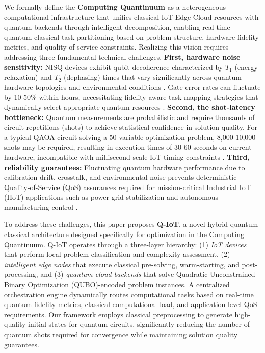 \documentclass[lettersize,journal]{IEEEtran}
\begin{document}
We formally define the \textbf{Computing Quantinuum} as a heterogeneous computational infrastructure that unifies classical IoT-Edge-Cloud resources with quantum backends through intelligent decomposition, enabling real-time quantum-classical task partitioning based on problem structure, hardware fidelity metrics, and quality-of-service constraints. Realizing this vision requires addressing three fundamental technical challenges. \textbf{First, hardware noise sensitivity:} NISQ devices exhibit qubit decoherence characterized by $T_1$ (energy relaxation) and $T_2$ (dephasing) times that vary significantly across quantum hardware topologies and environmental conditions \cite{Krantz2019}. Gate error rates can fluctuate by 10-50\% within hours, necessitating fidelity-aware task mapping strategies that dynamically select appropriate quantum resources \cite{Tannu2019}. \textbf{Second, the shot-latency bottleneck:} Quantum measurements are probabilistic and require thousands of circuit repetitions (shots) to achieve statistical confidence in solution quality. For a typical QAOA circuit solving a 50-variable optimization problem, 8,000-10,000 shots may be required, resulting in execution times of 30-60 seconds on current hardware, incompatible with millisecond-scale IoT timing constraints \cite{Zhou2020}. \textbf{Third, reliability guarantees:} Fluctuating quantum hardware performance due to calibration drift, crosstalk, and environmental noise prevents deterministic Quality-of-Service (QoS) assurances required for mission-critical Industrial IoT (IIoT) applications such as power grid stabilization and autonomous manufacturing control \cite{Murali2019,Harper2020}.

To address these challenges, this paper proposes \textbf{Q-IoT}, a novel hybrid quantum-classical architecture designed specifically for optimization in the Computing Quantinuum. Q-IoT operates through a three-layer hierarchy: (1) \textit{IoT devices} that perform local problem classification and complexity assessment, (2) \textit{intelligent edge nodes} that execute classical pre-solving, warm-starting, and post-processing, and (3) \textit{quantum cloud backends} that solve Quadratic Unconstrained Binary Optimization (QUBO)-encoded problem instances. A centralized orchestration engine dynamically routes computational tasks based on real-time quantum fidelity metrics, classical computational load, and application-level QoS requirements. Our framework employs classical preprocessing to generate high-quality initial states for quantum circuits, significantly reducing the number of quantum shots required for convergence while maintaining solution quality guarantees.
\end{document}
